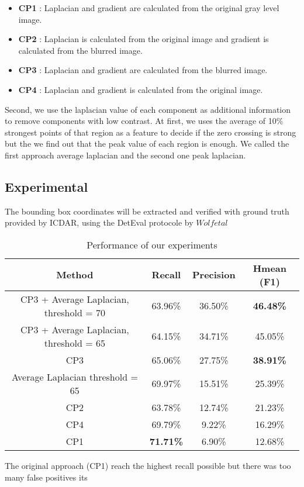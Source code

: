 \begin{itemize}
\item {\textbf{CP1}} : Laplacian and gradient are calculated from the original gray level image.
\item {\textbf{CP2}} : Laplacian is calculated from the original image and gradient is calculated from the blurred image.
\item {\textbf{CP3}} : Laplacian and gradient are calculated from the blurred image.
\item {\textbf{CP4}} : Laplacian  and gradient is calculated from the original image.
\end{itemize}

Second, we use the laplacian value of each component as additional information to remove components with low contrast. At first, we uses the average of 10\% strongest points of that region as a feature to decide if the zero crossing is strong but the we find out that the peak value of each region is enough. We called the first approach average laplacian and the second one peak laplacian.

\subsection{Experimental}
The bounding box coordinates will be extracted and verified with ground truth provided by ICDAR, using the DetEval protocole by $Wolf et al$ \cite{WolfIJDAR2006}

\begin {table}[H]

\begin{tabular}{|c|c|c|c|}
\hline 
\textbf{Method} & \textbf{Recall} & \textbf{Precision} & \textbf{Hmean (F1)} \\ 
\hline 
CP3 + Average Laplacian, threshold = 70 & 63.96\% & 36.50\% & \textbf{46.48\%} \\ 
\hline 
CP3 + Average Laplacian, threshold = 65  & 64.15\% & 34.71\% & 45.05\%\\ 
\hline 
CP3 & 65.06\% & 27.75\% & \textbf{38.91\%} \\ 
\hline
Average Laplacian threshold = 65  & 69.97\% & 15.51\% & 25.39\% \\ 
\hline  
CP2 & 63.78\% & 12.74\% & 21.23\% \\ 
\hline 
CP4 & 69.79\% & 9.22\% & 16.29\% \\ 
\hline 
CP1 &\textbf{ 71.71\%} & 6.90\% & 12.68\% \\ 
\hline 
\end{tabular} 
\caption{Performance of our experiments}\label{tab:performanceOur} 
\end{table}

The original approach (CP1) reach the highest recall possible but there was too many false positives its 